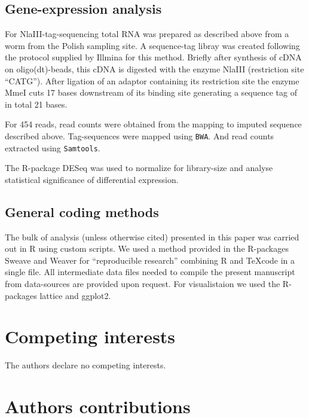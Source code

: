 \documentclass[10pt]{bmc_article}
\newenvironment{bmcformat}{\begin{raggedright}\baselineskip20pt\sloppy\setboolean{publ}{false}}{\end{raggedright}\baselineskip20pt\sloppy}
\begin{document}
\begin{bmcformat}
\subsection*{Gene-expression analysis}

For NlaIII-tag-sequencing total RNA was prepared as described above
from a worm from the Polish sampling site. A sequence-tag libray was
created following the protocol supplied by Illmina for this method.
Briefly after synthesis of cDNA on oligo(dt)-beads, this cDNA is
digested with the enzyme NlaIII (restriction site ``CATG''). After
ligation of an adaptor containing its restriction site the enzyme MmeI
cuts 17 bases downstream of its binding site generating a sequence tag
of in total 21 bases.

For 454 reads, read counts were obtained from the mapping to imputed
sequence described above. Tag-sequences were mapped using
\texttt{BWA}\cite{pmid19451168}. And read counts extracted using
\texttt{Samtools}.

The R-package DESeq\cite{pmid20979621} was used to normalize for
library-size and analyse statistical significance of differential
expression.

\subsection*{General coding methods}

The bulk of analysis (unless otherwise cited) presented in this paper
was carried out in R \cite{R_project} using custom scripts. We used a
method provided in the R-packages
Sweave\cite{lmucs-papers:Leisch:2002} and Weaver\cite{weaver} for
``reproducible research'' combining R and \TeX code in a single
file. All intermediate data files needed to compile the present
manuscript from data-sources are provided upon request. For
visualistaion we used the R-packages lattice\cite{lattice-book} and
ggplot2\cite{ggplot-book}.


\section*{Competing interests}
The authors declare no competing interests.

\section*{Authors contributions}


\end{bmcformat}
\end{document}
